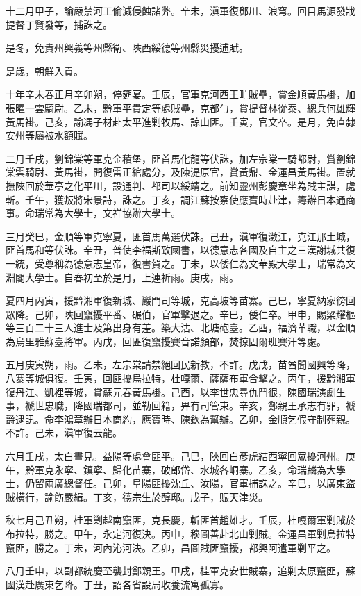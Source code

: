 \begin{pinyinscope}
十二月甲子，諭嚴禁河工偷減侵蝕諸弊。辛未，滇軍復鄧川、浪穹。回目馬源發戕提督丁賢發等，捕誅之。

是冬，免貴州興義等州縣衛、陜西綏德等州縣災擾逋賦。

是歲，朝鮮入貢。

十年辛未春正月辛卯朔，停筵宴。壬辰，官軍克河西王甿賊壘，賞金順黃馬褂，加張曜一雲騎尉。乙未，黔軍平貴定等處賊壘，克都勻，賞提督林從泰、總兵何雄輝黃馬褂。己亥，諭馮子材赴太平進剿牧馬、諒山匪。壬寅，官文卒。是月，免直隸安州等屬被水額賦。

二月壬戌，劉錦棠等軍克金積堡，匪首馬化龍等伏誅，加左宗棠一騎都尉，賞劉錦棠雲騎尉、黃馬褂，開復雷正綰處分，及陳湜原官，賞黃鼎、金運昌黃馬褂。置就撫陜回於華亭之化平川，設通判、都司以綏靖之。前知靈州彭慶章坐為賊主謀，處斬。壬午，獲叛將宋景詩，誅之。丁亥，調江蘇按察使應寶時赴津，籌辦日本通商事。命瑞常為大學士，文祥協辦大學士。

三月癸巳，金順等軍克寧夏，匪首馬萬選伏誅。己丑，滇軍復澂江，克江那土城，匪首馬和等伏誅。辛丑，普使李福斯致國書，以德意志各國及自主之三漢謝城共復一統，受尊稱為德意志皇帝，復書賀之。丁未，以倭仁為文華殿大學士，瑞常為文淵閣大學士。自春初至於是月，上連祈雨。庚戌，雨。

夏四月丙寅，援黔湘軍復新城、巖門司等城，克高坡等苗寨。己巳，寧夏納家徬回眾降。己卯，陜回竄擾平番、碾伯，官軍擊退之。辛巳，倭仁卒。甲申，賜梁耀樞等三百二十三人進士及第出身有差。築大沽、北塘砲臺。乙酉，福濟革職，以金順為烏里雅蘇臺將軍。丙戌，回匪復竄擾賽音諾顏部，焚掠固爾班賽汗等處。

五月庚寅朔，雨。乙未，左宗棠請禁絕回民新教，不許。戊戌，苗酋聞國興等降，八寨等城俱復。壬寅，回匪擾烏拉特，杜嘎爾、薩薩布軍合擊之。丙午，援黔湘軍復丹江、凱裡等城，賞蘇元春黃馬褂。己酉，以李世忠尋仇鬥很，陳國瑞演劇生事，褫世忠職，降國瑞都司，並勒回籍，畀有司管束。辛亥，鄭親王承志有罪，褫爵逮訊。命李鴻章辦日本商約，應寶時、陳欽為幫辦。乙卯，金順乞假守制葬親。不許。己未，滇軍復云龍。

六月壬戌，太白晝見。益陽等處會匪平。己巳，陜回白彥虎結西寧回眾擾河州。庚午，黔軍克永寧、鎮寧、歸化苗寨，破郎岱、水城各峒寨。乙亥，命瑞麟為大學士，仍留兩廣總督任。己卯，阜陽匪擾沈丘、汝陽，官軍捕誅之。辛巳，以廣東盜賊橫行，諭飭嚴緝。丁亥，德宗生於醇邸。戊子，賑天津災。

秋七月己丑朔，桂軍剿越南竄匪，克長慶，斬匪首趙雄才。壬辰，杜嘎爾軍剿賊於布拉特，勝之。甲午，永定河復決。丙申，穆圖善赴北山剿賊。金運昌軍剿烏拉特竄匪，勝之。丁未，河內沁河決。乙卯，昌圖賊匪竄擾，都興阿遣軍剿平之。

八月壬申，以副都統慶至襲封鄭親王。甲戌，桂軍克安世賊寨，追剿太原竄匪，蘇國漢赴廣東乞降。丁丑，詔各省設局收養流寓孤寡。


\end{pinyinscope}
